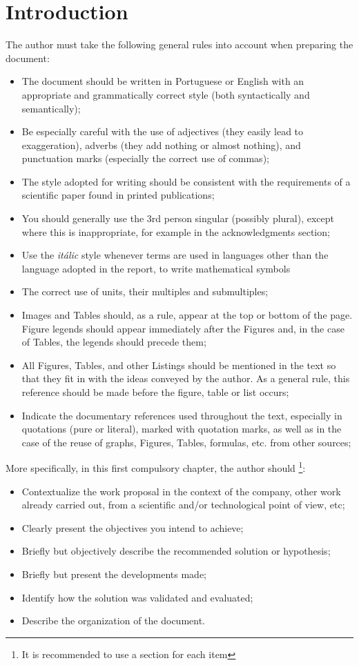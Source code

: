 \chapter{Introduction}

The author must take the following general rules into account when preparing the document:
\begin{itemize}
	\item The document should be written in Portuguese or English with an appropriate and grammatically correct style (both syntactically and semantically);
	\item Be especially careful with the use of adjectives (they easily lead to exaggeration), adverbs (they add nothing or almost nothing), and punctuation marks (especially the correct use of commas);
	\item The style adopted for writing should be consistent with the requirements of a scientific paper found in printed publications;
	\item You should generally use the 3rd person singular (possibly plural), except where this is inappropriate, for example in the acknowledgments section;
	\item Use the \textit{it\'{a}lic} style whenever terms are used in languages other than the language adopted in the report, to write mathematical symbols
    	\item The correct use of units, their multiples and submultiples;
	\item Images and Tables should, as a rule, appear at the top or bottom of the page. Figure legends should appear immediately after the Figures and, in the case of Tables, the legends should precede them;
	\item All Figures, Tables, and other Listings should be mentioned in the text so that they fit in with the ideas conveyed by the author. As a general rule, this reference should be made before the figure, table or list occurs;
	\item Indicate the documentary references used throughout the text, especially in quotations (pure or literal), marked with quotation marks, as well as in the case of the reuse of graphs, Figures, Tables, formulas, etc. from other sources;
\end{itemize}
More specifically, in this first compulsory chapter,  the author should \footnote{It is recommended to use a section for each item}:
\begin{itemize}
	\item Contextualize the work proposal in the context of the company, other work already carried out, from a scientific and/or technological point of view, etc;
	\item Clearly present the objectives you intend to achieve;
	\item Briefly but objectively describe the recommended solution or hypothesis;
	\item Briefly but present the developments made;
	\item Identify how the solution was validated and evaluated;
	\item Describe the organization of the document.
\end{itemize}

